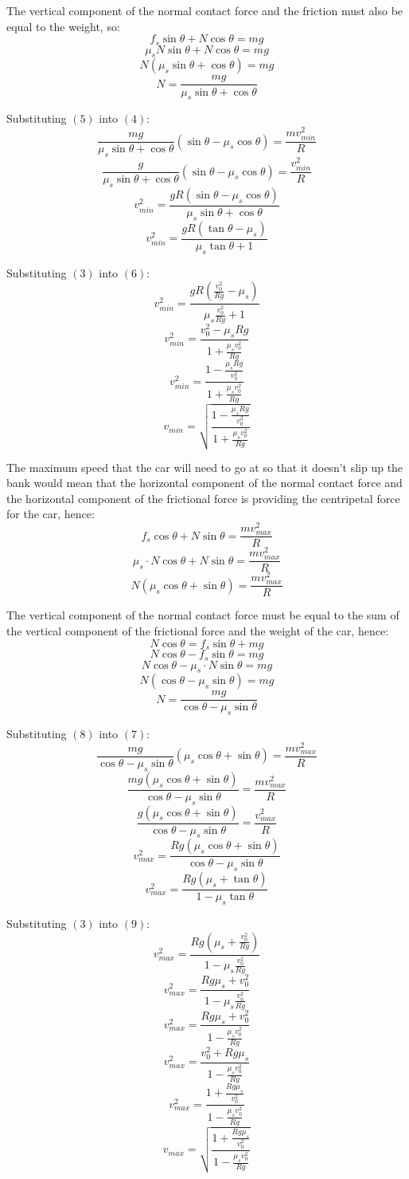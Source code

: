 \documentclass[11pt]{article}
\begin{document}
The vertical component of the normal contact force and the friction must also be equal to the weight, so:
\[f_s \sin \theta + N \cos \theta = mg\]
\[\mu_s N \sin \theta + N \cos \theta = mg\]
\[N (\mu_s \sin \theta + \cos \theta) = mg\]
\[N = \frac{mg}{\mu_s \sin \theta + \cos \theta} \tag{5}\]

Substituting \((5)\) into \((4)\):
\[\frac{mg}{\mu_s \sin \theta + \cos \theta} (\sin \theta - \mu_s \cos \theta) = \frac{mv_{min}^2}{R}\]
\[\frac{g}{\mu_s \sin \theta + \cos \theta} (\sin \theta - \mu_s \cos \theta) = \frac{v_{min}^2}{R}\]
\[v_{min}^2 = \frac{gR(\sin \theta - \mu_s \cos \theta)}{\mu_s \sin \theta + \cos \theta}\]
\[v_{min}^2 = \frac{gR(\tan \theta - \mu_s)}{\mu_s \tan \theta + 1} \tag{6}\]

Substituting \((3)\) into \((6)\):
\[v_{min}^2 = \frac{gR \left(\frac{v_0^2}{Rg} - \mu_s \right)}{\mu_s \frac{v_0^2}{Rg} + 1}\]
\[v_{min}^2 = \frac{v_0^2 - \mu_s Rg}{1 + \frac{\mu_s v_0^2}{Rg}}\]
\[v_{min}^2 = \frac{1 - \frac{\mu_s Rg}{v_0^2}}{1 + \frac{\mu_s v_0^2}{Rg}}\]
\[v_{min} = \sqrt{\frac{1 - \frac{\mu_s Rg}{v_0^2}}{1 + \frac{\mu_s v_0^2}{Rg}}}\]

\newpage

The maximum speed that the car will need to go at so that it doesn't slip up the bank would mean that the horizontal component of the normal contact force and the horizontal component of the frictional force is providing the centripetal force for the car, hence:
\[f_s \cos \theta + N \sin \theta = \frac{mv_{max}^2}{R}\]
\[\mu_s \cdot N \cos \theta + N \sin \theta = \frac{mv_{max}^2}{R}\]
\[N (\mu_s \cos \theta + \sin \theta) = \frac{mv_{max}^2}{R} \tag{7}\]

The vertical component of the normal contact force must be equal to the sum of the vertical component of the frictional force and the weight of the car, hence:
\[N \cos \theta = f_s \sin \theta + mg\]
\[N \cos \theta - f_s \sin \theta = mg\]
\[N \cos \theta - \mu_s \cdot N \sin \theta = mg\]
\[N (\cos \theta - \mu_s \sin \theta) = mg\]
\[N = \frac{mg}{\cos \theta - \mu_s \sin \theta} \tag{8}\]

Substituting \((8)\) into \((7)\):
\[\frac{mg}{\cos \theta - \mu_s \sin \theta} (\mu_s \cos \theta + \sin \theta) = \frac{mv_{max}^2}{R}\]
\[\frac{mg(\mu_s \cos \theta + \sin \theta)}{\cos \theta - \mu_s \sin \theta} = \frac{mv_{max}^2}{R}\]
\[\frac{g(\mu_s \cos \theta + \sin \theta)}{\cos \theta - \mu_s \sin \theta} = \frac{v_{max}^2}{R}\]
\[v_{max}^2 = \frac{Rg(\mu_s \cos \theta + \sin \theta)}{\cos \theta - \mu_s \sin \theta}\]
\[v_{max}^2 = \frac{Rg(\mu_s + \tan \theta)}{1 - \mu_s \tan \theta} \tag{9}\]

\newpage

Substituting \((3)\) into \((9)\):
\[v_{max}^2 = \frac{Rg(\mu_s + \frac{v_0^2}{Rg})}{1 - \mu_s \frac{v_0^2}{Rg}}\]
\[v_{max}^2 = \frac{Rg\mu_s + v_0^2}{1 - \mu_s \frac{v_0^2}{Rg}}\]
\[v_{max}^2 = \frac{Rg\mu_s + v_0^2}{1 - \frac{\mu_s v_0^2}{Rg}}\]
\[v_{max}^2 = \frac{v_0^2 + Rg\mu_s}{1 - \frac{\mu_s v_0^2}{Rg}}\]
\[v_{max}^2 = \frac{1 + \frac{Rg\mu_s}{v_0^2}}{1 - \frac{\mu_s v_0^2}{Rg}}\]
\[v_{max} = \sqrt{\frac{1 + \frac{Rg\mu_s}{v_0^2}}{1 - \frac{\mu_s v_0^2}{Rg}}}\]
\end{document}

